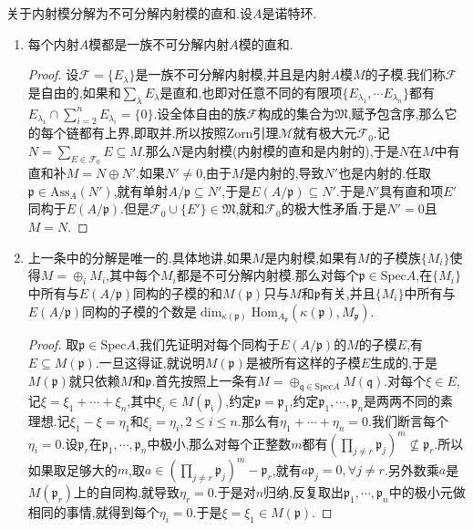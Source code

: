 关于内射模分解为不可分解内射模的直和.设$A$是诺特环.
\begin{enumerate}
	\item 每个内射$A$模都是一族不可分解内射$A$模的直和.
	\begin{proof}
		
		设$\mathscr{F}=\{E_{\lambda}\}$是一族不可分解内射模,并且是内射$A$模$M$的子模.我们称$\mathscr{F}$是自由的,如果和$\sum_{\lambda}E_{\lambda}$是直和,也即对任意不同的有限项$\{E_{\lambda_1},\cdots E_{\lambda_n}\}$都有$E_{\lambda_1}\cap\sum_{i=2}^nE_{\lambda_i}=\{0\}$.设全体自由的族$\mathscr{F}$构成的集合为$\mathfrak{M}$,赋予包含序,那么它的每个链都有上界,即取并.所以按照Zorn引理$\mathscr{M}$就有极大元$\mathscr{F}_0$.记$N=\sum_{E\in\mathscr{F}_0}E\subseteq M$.那么$N$是内射模(内射模的直和是内射的),于是$N$在$M$中有直和补$M=N\oplus N'$.如果$N'\not=0$,由于$M$是内射的,导致$N'$也是内射的.任取$\mathfrak{p}\in\mathrm{Ass}_A(N')$,就有单射$A/\mathfrak{p}\subseteq N'$,于是$E(A/\mathfrak{p})\subseteq N'$.于是$N'$具有直和项$E'$同构于$E(A/\mathfrak{p})$.但是$\mathscr{F}_0\cup\{E'\}\in\mathfrak{M}$,就和$\mathscr{F}_0$的极大性矛盾.于是$N'=0$且$M=N$.
	\end{proof}
    \item 上一条中的分解是唯一的.具体地讲,如果$M$是内射模,如果有$M$的子模族$\{M_i\}$使得$M=\oplus_iM_i$,其中每个$M_i$都是不可分解内射模.那么对每个$\mathfrak{p}\in\mathrm{Spec}A$,在$\{M_i\}$中所有与$E(A/\mathfrak{p})$同构的子模的和$M(\mathfrak{p})$只与$M$和$\mathfrak{p}$有关,并且$\{M_i\}$中所有与$E(A/\mathfrak{p})$同构的子模的个数是$\dim_{\kappa(\mathfrak{p})}\mathrm{Hom}_{A_{\mathfrak{p}}}(\kappa(\mathfrak{p}),M_{\mathfrak{p}})$.
    \begin{proof}
    	
    	取$\mathfrak{p}\in\mathrm{Spec}A$,我们先证明对每个同构于$E(A/\mathfrak{p})$的$M$的子模$E$,有$E\subseteq M(\mathfrak{p})$.一旦这得证,就说明$M(\mathfrak{p})$是被所有这样的子模$E$生成的,于是$M(\mathfrak{p})$就只依赖$M$和$\mathfrak{p}$.首先按照上一条有$M=\oplus_{\mathfrak{q}\in\mathrm{Spec}A}M(\mathfrak{q})$.对每个$\xi\in E$,记$\xi=\xi_1+\cdots+\xi_n$,其中$\xi_i\in M(\mathfrak{p_i})$,约定$\mathfrak{p}=\mathfrak{p}_1$,约定$\mathfrak{p}_1,\cdots,\mathfrak{p}_n$是两两不同的素理想.记$\xi_1-\xi=\eta_1$和$\xi_i=\eta_i,2\le i\le n$.那么有$\eta_1+\cdots+\eta_n=0$.我们断言每个$\eta_i=0$.设$\mathfrak{p}_r$在$\mathfrak{p}_1,\cdots,\mathfrak{p}_n$中极小,那么对每个正整数$m$都有$(\prod_{j\not=r}\mathfrak{p}_j)^m\not\subseteq\mathfrak{p}_r$.所以如果取足够大的$m$,取$a\in(\prod_{j\not=r}\mathfrak{p}_j)^m-\mathfrak{p}_r$,就有$a\mathfrak{p}_j=0,\forall j\not=r$.另外数乘$a$是$M(\mathfrak{p}_r)$上的自同构,就导致$\eta_r=0$.于是对$n$归纳,反复取出$\mathfrak{p}_1,\cdots,\mathfrak{p}_n$中的极小元做相同的事情,就得到每个$\eta_i=0$.于是$\xi=\xi_1\in M(\mathfrak{p})$.
    	

\end{proof}
\end{enumerate}
